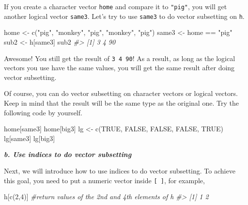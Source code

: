 \documentclass[
]{book}
\newenvironment{Shaded}{\begin{snugshade}}{\end{snugshade}}
\newcommand{\CommentTok}[1]{\textcolor[rgb]{0.56,0.35,0.01}{\textit{#1}}}
\newcommand{\ConstantTok}[1]{\textcolor[rgb]{0.00,0.00,0.00}{#1}}
\newcommand{\DecValTok}[1]{\textcolor[rgb]{0.00,0.00,0.81}{#1}}
\newcommand{\FunctionTok}[1]{\textcolor[rgb]{0.00,0.00,0.00}{#1}}
\newcommand{\NormalTok}[1]{#1}
\newcommand{\OtherTok}[1]{\textcolor[rgb]{0.56,0.35,0.01}{#1}}
\newcommand{\SpecialCharTok}[1]{\textcolor[rgb]{0.00,0.00,0.00}{#1}}
\newcommand{\StringTok}[1]{\textcolor[rgb]{0.31,0.60,0.02}{#1}}
\begin{document}
If you create a character vector \texttt{home} and compare it to \texttt{"pig"}, you will get another logical vector \texttt{same3}. Let's try to use \texttt{same3} to do vector subsetting on \texttt{h}.

\begin{Shaded}
\begin{Highlighting}[]
\NormalTok{home }\OtherTok{\textless{}{-}} \FunctionTok{c}\NormalTok{(}\StringTok{"pig"}\NormalTok{, }\StringTok{"monkey"}\NormalTok{, }\StringTok{"pig"}\NormalTok{, }\StringTok{"monkey"}\NormalTok{, }\StringTok{"pig"}\NormalTok{)}
\NormalTok{same3 }\OtherTok{\textless{}{-}}\NormalTok{ home }\SpecialCharTok{==} \StringTok{"pig"}
\NormalTok{sub2 }\OtherTok{\textless{}{-}}\NormalTok{ h[same3]}
\NormalTok{sub2}
\CommentTok{\#\textgreater{} [1]  3  4 90}
\end{Highlighting}
\end{Shaded}

Awesome! You still get the result of \texttt{3\ 4\ 90}! As a result, as long as the logical vectors you use have the same values, you will get the same result after doing vector subsetting.

Of course, you can do vector subsetting on character vectors or logical vectors. Keep in mind that the result will be the same type as the original one. Try the following code by yourself.

\begin{Shaded}
\begin{Highlighting}[]
\NormalTok{home[same3]}
\NormalTok{home[big3]}
\NormalTok{lg }\OtherTok{\textless{}{-}} \FunctionTok{c}\NormalTok{(}\ConstantTok{TRUE}\NormalTok{, }\ConstantTok{FALSE}\NormalTok{, }\ConstantTok{FALSE}\NormalTok{, }\ConstantTok{FALSE}\NormalTok{, }\ConstantTok{TRUE}\NormalTok{)}
\NormalTok{lg[same3]}
\NormalTok{lg[big3]}
\end{Highlighting}
\end{Shaded}

\textbf{\emph{b. Use indices to do vector subsetting}}

Next, we will introduce how to use indices to do vector subsetting. To achieve this goal, you need to put a numeric vector inside \texttt{{[}\ {]}}, for example,

\begin{Shaded}
\begin{Highlighting}[]
\NormalTok{h[}\FunctionTok{c}\NormalTok{(}\DecValTok{2}\NormalTok{,}\DecValTok{4}\NormalTok{)]  }\CommentTok{\#return values of the 2nd and 4th elements of h}
\CommentTok{\#\textgreater{} [1] 1 2}
\end{Highlighting}
\end{Shaded}
\end{document}
